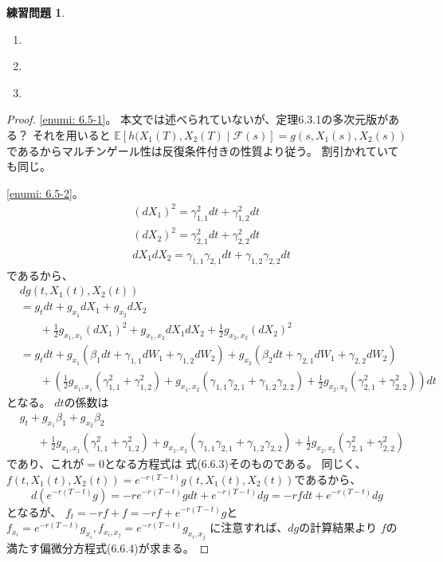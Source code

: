 \documentclass[uplatex]{jsarticle}
\theoremstyle{definition}
\newtheorem{prob}[prob]{練習問題}
\def\E{\mathbb{E}}
\def\mcF{\mathcal{F}}
\begin{document}
\begin{prob}\label{prob: 6.5}
  \begin{enumerate}
    \item \label{enumi: 6.5-1}
    \item \label{enumi: 6.5-2}
    \item \label{enumi: 6.5-3}
  \end{enumerate}
\end{prob}

\begin{proof}
  \ref{enumi: 6.5-1}。
  本文では述べられていないが、定理6.3.1の多次元版がある？
  それを用いると
  \(\E[h(X_1(T),X_2(T)\mid \mcF(s)] = g(s,X_1(s),X_2(s))\)
  であるからマルチンゲール性は反復条件付きの性質より従う。
  割引かれていても同じ。

  \ref{enumi: 6.5-2}。
  \begin{align*}
    &(dX_1)^2
    = \gamma_{1,1}^2dt + \gamma_{1,2}^2dt \\
    &(dX_2)^2
    = \gamma_{2,1}^2dt + \gamma_{2,2}^2dt \\
    &dX_1dX_2
    = \gamma_{1,1}\gamma_{2,1}dt + \gamma_{1,2}\gamma_{2,2}dt
  \end{align*}
  であるから、
  \begin{align*}
    &dg(t,X_1(t),X_2(t)) \\
    &= g_tdt
    + g_{x_1}dX_1 + g_{x_2}dX_2 \\
    &\ \ \ \ \ \ \ \
    + \frac{1}{2}g_{x_1,x_1}(dX_1)^2
    + g_{x_1,x_2}dX_1dX_2
    + \frac{1}{2}g_{x_2,x_2}(dX_2)^2 \\
    &= g_tdt
    + g_{x_1}\left( \beta_1dt + \gamma_{1,1}dW_1 + \gamma_{1,2}dW_2\right)
    + g_{x_2}\left( \beta_2dt + \gamma_{2,1}dW_1 + \gamma_{2,2}dW_2\right) \\
    &\ \ \ \ \ \ \ \
    + \left( \frac{1}{2}g_{x_1,x_1}
    \left( \gamma_{1,1}^2 + \gamma_{1,2}^2\right)
    + g_{x_1,x_2}\left( \gamma_{1,1}\gamma_{2,1}
    + \gamma_{1,2}\gamma_{2,2}\right)
    + \frac{1}{2}g_{x_2,x_2}
    \left( \gamma_{2,1}^2 + \gamma_{2,2}^2\right) \right) dt
  \end{align*}
  となる。
  \(dt\)の係数は
  \begin{align*}
    &g_t + g_{x_1}\beta_1 + g_{x_2}\beta_2 \\
    &\ \ \ \ \ \ \ +
    \frac{1}{2}g_{x_1,x_1}
    \left( \gamma_{1,1}^2 + \gamma_{1,2}^2\right)
    + g_{x_1,x_2}\left( \gamma_{1,1}\gamma_{2,1}
    + \gamma_{1,2}\gamma_{2,2}\right)
    + \frac{1}{2}g_{x_2,x_2}
    \left( \gamma_{2,1}^2 + \gamma_{2,2}^2\right)
  \end{align*}
  であり、これが\(=0\)となる方程式は
  式(6.6.3)そのものである。
  同じく、
  \(f(t,X_1(t),X_2(t)) = e^{-r(T-t)}g(t,X_1(t),X_2(t))\)であるから、
  \[
  d(e^{-r(T-t)}g) = -re^{-r(T-t)}gdt + e^{-r(T-t)}dg
  = -r fdt + e^{-r(T-t)}dg
  \]
  となるが、
  \(f_t = -rf + f = -rf + e^{-r(T-t)}g\)と
  \(f_{x_i} = e^{-r(T-t)}g_{x_i},
  f_{x_i,x_j} = e^{-r(T-t)}g_{x_i,x_j}\)
  に注意すれば、\(dg\)の計算結果より
  \(f\)の満たす偏微分方程式(6.6.4)が求まる。


\end{proof}
\end{document}
